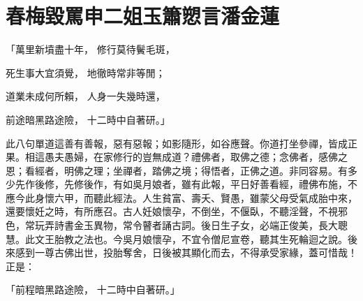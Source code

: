 %

\chapter{春梅毀罵申二姐\KG 玉簫愬言潘金蓮}


「萬里新墳盡十年，  修行莫待鬢毛斑，

死生事大宜須覺，  地徹時常非等閒；

道業未成何所賴，  人身一失幾時還，

前途暗黑路途險，  十二時中自著研。」

此八句單道這善有善報，惡有惡報；如影隨形，如谷應聲。你道打坐參禪，皆成正果。相這愚夫愚婦，在家修行的豈無成道？禮佛者，取佛之德；念佛者，感佛之恩；看經者，明佛之理；坐禪者，踏佛之境；得悟者，正佛之道。非同容易。有多少先作後修，先修後作，有如吳月娘者，雖有此報，平日好善看經，禮佛布施，不應今此身懷六甲，而聽此經法。人生貧富、壽夭、賢愚，雖蒙父母受氣成胎中來，還要懷妊之時，有所應召。古人妊娘懷孕，不倒坐，不偃臥，不聽淫聲，不視邪色，常玩弄詩書金玉異物，常令瞽者誦古詞。後日生子女，必端正俊美，長大聰慧。此文王胎教之法也。今吳月娘懷孕，不宜令僧尼宣卷，聽其生死輪迴之說。後來感到一尊古佛出世，投胎奪舍，日後被其顯化而去，不得承受家緣，蓋可惜哉！正是：

「前程暗黑路途險，  十二時中自著研。」

